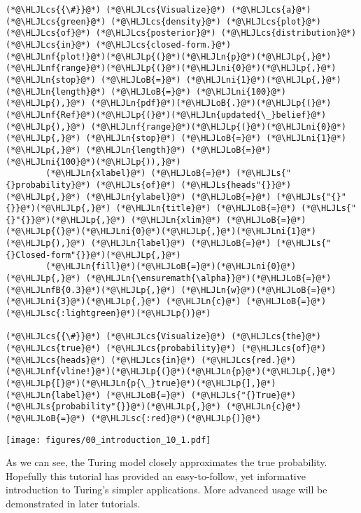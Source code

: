\documentclass[12pt,a4paper]{article}
\newcommand{\HLJLn}[1]{#1}
\newcommand{\HLJLnf}[1]{\textcolor[RGB]{66,102,213}{#1}}
\newcommand{\HLJLs}[1]{\textcolor[RGB]{201,61,57}{#1}}
\newcommand{\HLJLsc}[1]{\textcolor[RGB]{201,61,57}{#1}}
\newcommand{\HLJLnfB}[1]{\textcolor[RGB]{59,151,46}{#1}}
\newcommand{\HLJLni}[1]{\textcolor[RGB]{59,151,46}{#1}}
\newcommand{\HLJLoB}[1]{\textcolor[RGB]{102,102,102}{\textbf{#1}}}
\newcommand{\HLJLp}[1]{#1}
\newcommand{\HLJLcs}[1]{\textcolor[RGB]{153,153,119}{\textit{#1}}}
\begin{document}
\begin{lstlisting}
(*@\HLJLcs{{\#}}@*) (*@\HLJLcs{Visualize}@*) (*@\HLJLcs{a}@*) (*@\HLJLcs{green}@*) (*@\HLJLcs{density}@*) (*@\HLJLcs{plot}@*) (*@\HLJLcs{of}@*) (*@\HLJLcs{posterior}@*) (*@\HLJLcs{distribution}@*) (*@\HLJLcs{in}@*) (*@\HLJLcs{closed-form.}@*)
(*@\HLJLnf{plot!}@*)(*@\HLJLp{(}@*)(*@\HLJLn{p}@*)(*@\HLJLp{,}@*) (*@\HLJLnf{range}@*)(*@\HLJLp{(}@*)(*@\HLJLni{0}@*)(*@\HLJLp{,}@*) (*@\HLJLn{stop}@*) (*@\HLJLoB{=}@*) (*@\HLJLni{1}@*)(*@\HLJLp{,}@*) (*@\HLJLn{length}@*) (*@\HLJLoB{=}@*) (*@\HLJLni{100}@*)(*@\HLJLp{),}@*) (*@\HLJLn{pdf}@*)(*@\HLJLoB{.}@*)(*@\HLJLp{(}@*)(*@\HLJLnf{Ref}@*)(*@\HLJLp{(}@*)(*@\HLJLn{updated{\_}belief}@*)(*@\HLJLp{),}@*) (*@\HLJLnf{range}@*)(*@\HLJLp{(}@*)(*@\HLJLni{0}@*)(*@\HLJLp{,}@*) (*@\HLJLn{stop}@*) (*@\HLJLoB{=}@*) (*@\HLJLni{1}@*)(*@\HLJLp{,}@*) (*@\HLJLn{length}@*) (*@\HLJLoB{=}@*) (*@\HLJLni{100}@*)(*@\HLJLp{)),}@*) 
        (*@\HLJLn{xlabel}@*) (*@\HLJLoB{=}@*) (*@\HLJLs{"{}probability}@*) (*@\HLJLs{of}@*) (*@\HLJLs{heads"{}}@*)(*@\HLJLp{,}@*) (*@\HLJLn{ylabel}@*) (*@\HLJLoB{=}@*) (*@\HLJLs{"{}"{}}@*)(*@\HLJLp{,}@*) (*@\HLJLn{title}@*) (*@\HLJLoB{=}@*) (*@\HLJLs{"{}"{}}@*)(*@\HLJLp{,}@*) (*@\HLJLn{xlim}@*) (*@\HLJLoB{=}@*) (*@\HLJLp{(}@*)(*@\HLJLni{0}@*)(*@\HLJLp{,}@*)(*@\HLJLni{1}@*)(*@\HLJLp{),}@*) (*@\HLJLn{label}@*) (*@\HLJLoB{=}@*) (*@\HLJLs{"{}Closed-form"{}}@*)(*@\HLJLp{,}@*)
        (*@\HLJLn{fill}@*)(*@\HLJLoB{=}@*)(*@\HLJLni{0}@*)(*@\HLJLp{,}@*) (*@\HLJLn{\ensuremath{\alpha}}@*)(*@\HLJLoB{=}@*)(*@\HLJLnfB{0.3}@*)(*@\HLJLp{,}@*) (*@\HLJLn{w}@*)(*@\HLJLoB{=}@*)(*@\HLJLni{3}@*)(*@\HLJLp{,}@*) (*@\HLJLn{c}@*) (*@\HLJLoB{=}@*) (*@\HLJLsc{:lightgreen}@*)(*@\HLJLp{)}@*)

(*@\HLJLcs{{\#}}@*) (*@\HLJLcs{Visualize}@*) (*@\HLJLcs{the}@*) (*@\HLJLcs{true}@*) (*@\HLJLcs{probability}@*) (*@\HLJLcs{of}@*) (*@\HLJLcs{heads}@*) (*@\HLJLcs{in}@*) (*@\HLJLcs{red.}@*)
(*@\HLJLnf{vline!}@*)(*@\HLJLp{(}@*)(*@\HLJLn{p}@*)(*@\HLJLp{,}@*) (*@\HLJLp{[}@*)(*@\HLJLn{p{\_}true}@*)(*@\HLJLp{],}@*) (*@\HLJLn{label}@*) (*@\HLJLoB{=}@*) (*@\HLJLs{"{}True}@*) (*@\HLJLs{probability"{}}@*)(*@\HLJLp{,}@*) (*@\HLJLn{c}@*) (*@\HLJLoB{=}@*) (*@\HLJLsc{:red}@*)(*@\HLJLp{)}@*)
\end{lstlisting}

\texttt{[image: figures/00\_introduction\_10\_1.pdf]}

As we can see, the Turing model closely approximates the true probability. Hopefully this tutorial has provided an easy-to-follow, yet informative introduction to Turing's simpler applications. More advanced usage will be demonstrated in later tutorials.
\end{document}
